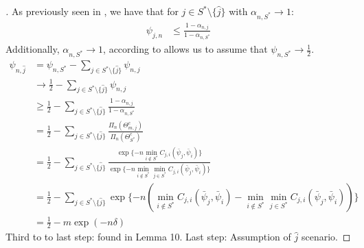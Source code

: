   \begin{proof}[]
    As previously seen in , we have that
    for $j \in S^* \setminus \{\hat{j}\}$ with $\alpha_{n, S^*} \rightarrow 1$:
    \begin{align}
      \psi_{j, n} &\leq \frac{1 - \alpha_{n, j}}{1 - \alpha_{n, S^*}}
    \end{align}
    Additionally, $\alpha_{n, S^*} \rightarrow 1$, according to  allows us to assume that $\psi_{n, S^*} \rightarrow \frac{1}{2}$.
    \begin{align}
      \psi_{n, \hat{j}} &= \psi_{n, S^*} - \sum_{j \in S^* \setminus
          \{\hat{j}\}} \psi_{n, j}\\
        &\rightarrow \frac{1}{2} - \sum_{j \in S^* \setminus \{\hat{j}\}}
            \psi_{n, j}\\
        &\geq \frac{1}{2} - \sum_{j \in S^* \setminus \{\hat{j}\}} \frac{1 -
            \alpha_{n, j}}{1 - \alpha_{n, S^*}} \\
        &= \frac{1}{2} - \sum_{j \in S^* \setminus \{\hat{j}\}}
            \frac{\Pi_n(\Theta_{m, j}^c)}{\Pi_n(\Theta_{S^*}^c)} \\
        &= \frac{1}{2} - \sum_{j \in S^* \setminus \{\hat{j}\}} \frac{\exp\{-n
            \min_{i \notin S^*} C_{j, i}(\bar{\psi}_j, \bar{\psi}_i) \}}{\exp\{-
            n \min_{i \notin S^*} \min_{j \in S^*} C_{j, i}(\bar{\psi}_j,
            \bar{\psi}_i) \}}\\
        &= \frac{1}{2} - \sum_{j \in S^* \setminus \{\hat{j}\}} \exp\{-
            n(\min_{i \notin S^*} C_{j, i}(\bar{\psi}_j, \bar{\psi}_i) -
            \min_{i \notin S^*} \min_{j \in S^*} C_{j, i}(\bar{\psi}_j,
            \bar{\psi}_i))\} \\
        &= \frac{1}{2} - m \exp(-n\delta)
    \end{align}
    Third to to last step: found in Lemma 10.
    Last step: Assumption of $\hat{j}$ scenario.
  \end{proof}
